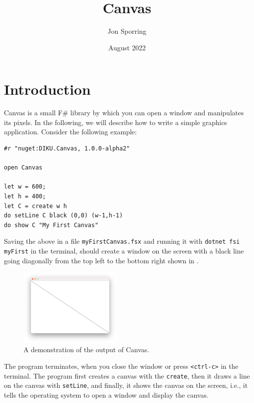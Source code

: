 \documentclass{article}
\title{Canvas}
\author{Jon Sporring}
\date{August 2022}
\begin{document}
\maketitle

\section{Introduction}
Canvas is a small F\# library by which you can open a window and manipulates its pixels. In the following, we will describe how to write a simple graphics application. Consider the following example:
\begin{lstlisting}
#r "nuget:DIKU.Canvas, 1.0.0-alpha2"

open Canvas

let w = 600;
let h = 400;
let C = create w h
do setLine C black (0,0) (w-1,h-1)
do show C "My First Canvas"
\end{lstlisting}
Saving the above in a file \texttt{myFirstCanvas.fsx} and running it with \texttt{dotnet fsi myFirst} in the terminal, should create a window on the screen with a black line going diagonally from the top left to the bottom right shown in .
\begin{figure}
  \centering
  \includegraphics[width=0.45\textwidth]{myFirstCanvas}
  \caption{A demonstration of the output of Canvas.}
  \label{fig:myFirstCanvas}
\end{figure}
The program terminates, when you close the window or press \texttt{<ctrl-c>} in the terminal. The program first creates a canvas with the \lstinline{create}, then it draws a line on the canvas with \lstinline{setLine}, and finally, it shows the canvas on the screen, i.e., it tells the operating system to open a window and display the canvas.
\end{document}
